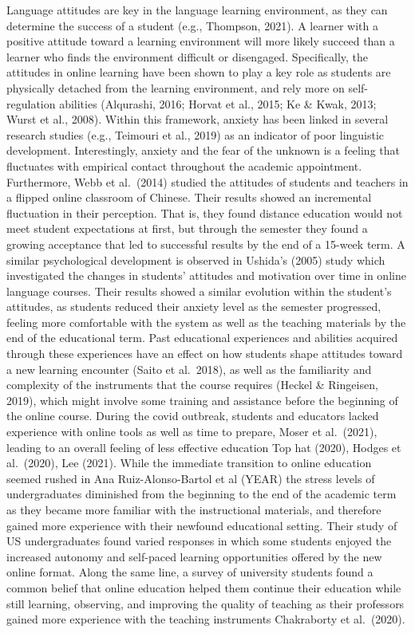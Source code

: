 \documentclass[
  man]{apa6}
\begin{document}
Language attitudes are key in the language learning environment, as they can determine the success of a student (e.g., Thompson, 2021). A learner with a positive attitude toward a learning environment will more likely succeed than a learner who finds the environment difficult or disengaged. Specifically, the attitudes in online learning have been shown to play a key role as students are physically detached from the learning environment, and rely more on self-regulation abilities (Alqurashi, 2016; Horvat et al., 2015; Ke \& Kwak, 2013; Wurst et al., 2008). Within this framework, anxiety has been linked in several research studies (e.g., Teimouri et al., 2019) as an indicator of poor linguistic development. Interestingly, anxiety and the fear of the unknown is a feeling that fluctuates with empirical contact throughout the academic appointment. Furthermore, Webb et al.~(2014) studied the attitudes of students and teachers in a flipped online classroom of Chinese. Their results showed an incremental fluctuation in their perception. That is, they found distance education would not meet student expectations at first, but through the semester they found a growing acceptance that led to successful results by the end of a 15-week term. A similar psychological development is observed in Ushida's (2005) study which investigated the changes in students' attitudes and motivation over time in online language courses. Their results showed a similar evolution within the student's attitudes, as students reduced their anxiety level as the semester progressed, feeling more comfortable with the system as well as the teaching materials by the end of the educational term.
Past educational experiences and abilities acquired through these experiences have an effect on how students shape attitudes toward a new learning encounter (Saito et al.~2018), as well as the familiarity and complexity of the instruments that the course requires (Heckel \& Ringeisen, 2019), which might involve some training and assistance before the beginning of the online course. During the covid outbreak, students and educators lacked experience with online tools as well as time to prepare, Moser et al.~(2021), leading to an overall feeling of less effective education Top hat (2020), Hodges et al.~(2020), Lee (2021). While the immediate transition to online education seemed rushed in Ana Ruiz-Alonso-Bartol et al (YEAR) the stress levels of undergraduates diminished from the beginning to the end of the academic term as they became more familiar with the instructional materials, and therefore gained more experience with their newfound educational setting. Their study of US undergraduates found varied responses in which some students enjoyed the increased autonomy and self-paced learning opportunities offered by the new online format. Along the same line, a survey of university students found a common belief that online education helped them continue their education while still learning, observing, and improving the quality of teaching as their professors gained more experience with the teaching instruments Chakraborty et al.~(2020).
\end{document}
